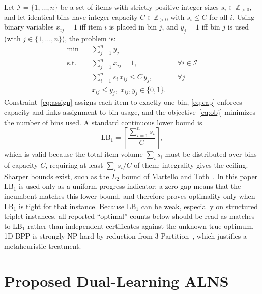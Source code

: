 \documentclass[conference]{IEEEtran}
\begin{document}
Let $\mathcal{I}=\{1,\dots,n\}$ be a set of items with strictly positive integer
sizes $s_i\in\mathbb{Z}_{>0}$, and let identical bins have integer capacity
$C\in\mathbb{Z}_{>0}$ with $s_i\le C$ for all $i$. Using binary variables
$x_{ij}=1$ iff item $i$ is placed in bin $j$, and $y_j=1$ iff bin $j$ is used
(with $j\in\{1,\dots,n\}$), the problem is:
\begin{align}
	\min \quad       & \sum_{j=1}^{n} y_j \label{eq:obj}                                                     \\
	\text{s.t.}\quad & \sum_{j=1}^{n} x_{ij}=1,               &  & \forall i\in\mathcal{I} \label{eq:assign} \\
	                 & \sum_{i=1}^{n} s_i\,x_{ij}\le C\,y_j,  &  & \forall j \label{eq:cap}                  \\
	                 & x_{ij}\le y_j,\; x_{ij},y_j\in\{0,1\}. &  & \label{eq:link}
\end{align}
Constraint~\eqref{eq:assign} assigns each item to exactly one bin,
\eqref{eq:cap} enforces capacity and links assignment to bin usage, and the
objective~\eqref{eq:obj} minimizes the number of bins used. A standard continuous
lower bound is
\begin{equation}
	\mathrm{LB}_1=\left\lceil \frac{\sum_{i=1}^{n} s_i}{C} \right\rceil ,\label{eq:lb}
\end{equation}
which is valid because the total item volume $\sum_i s_i$ must be distributed over
bins of capacity $C$, requiring at least $\sum_i s_i / C$ of them; integrality
gives the ceiling. Sharper bounds exist, such as the $L_2$ bound of Martello and
Toth~\cite{bMartello}. In this paper $\mathrm{LB}_1$ is used only as a uniform
progress indicator: a zero gap means that the incumbent matches this lower bound,
and therefore proves optimality only when $\mathrm{LB}_1$ is tight for that
instance. Because $\mathrm{LB}_1$ can be weak, especially on structured triplet
instances, all reported ``optimal'' counts below should be read as matches to
$\mathrm{LB}_1$ rather than independent certificates against the unknown true
optimum. 1D-BPP is strongly NP-hard by reduction from 3-Partition~\cite{bGarey},
which justifies a metaheuristic treatment.

\section{Proposed Dual-Learning ALNS}\label{sec:approach}
\end{document}

